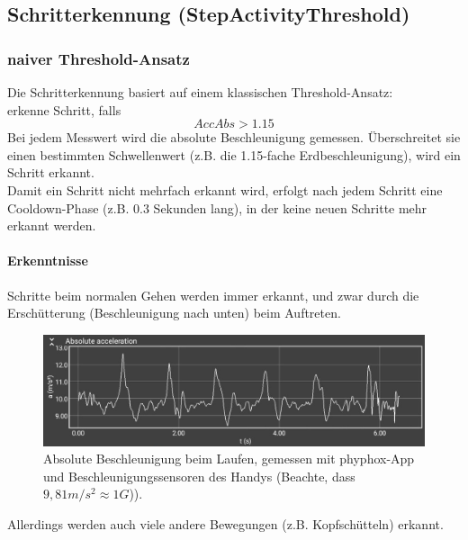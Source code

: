 \documentclass[a4paper,12pt]{article}
\begin{document}
\subsection{Schritterkennung (StepActivityThreshold)}
\subsubsection{naiver Threshold-Ansatz}
Die Schritterkennung basiert auf einem klassischen Threshold-Ansatz:\\
erkenne Schritt, falls 
\begin{equation}
	AccAbs > 1.15
\end{equation}
Bei jedem Messwert wird die absolute Beschleunigung gemessen. Überschreitet sie einen bestimmten Schwellenwert (z.B. die 1.15-fache Erdbeschleunigung), wird ein Schritt erkannt.\\ 
Damit ein Schritt nicht mehrfach erkannt wird, erfolgt nach jedem Schritt eine Cooldown-Phase (z.B. 0.3 Sekunden lang), in der keine neuen Schritte mehr erkannt werden.
\paragraph{Erkenntnisse}
Schritte beim normalen Gehen werden immer erkannt, und zwar durch die Erschütterung (Beschleunigung nach unten) beim Auftreten. 
\begin{figure}
	\centering
\includegraphics[width = 14cm]{bilder/steps.jpg}
	\caption{Absolute Beschleunigung beim Laufen, gemessen mit phyphox-App und Beschleunigungssensoren des Handys  (Beachte, dass $9,81 m/s^2 \approx 1 G$)).}
\end{figure} 
Allerdings werden auch viele andere Bewegungen (z.B. Kopfschütteln) erkannt.
\end{document}
